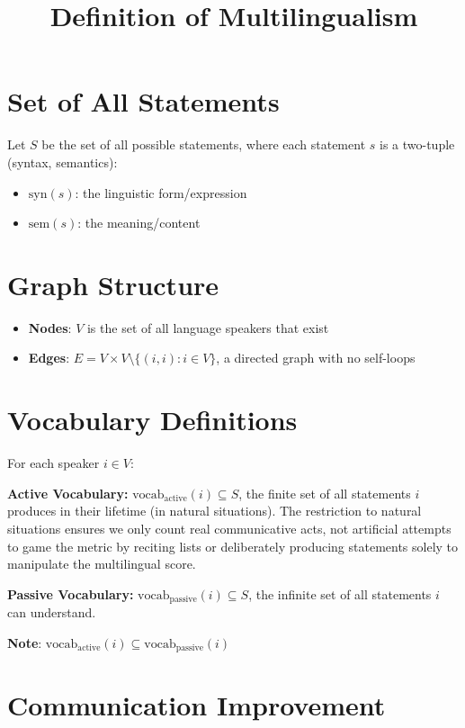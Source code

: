 \documentclass[11pt,a4paper]{article}
\title{Definition of Multilingualism}
\author{}
\begin{document}
\maketitle

\section{Set of All Statements}

Let $S$ be the set of all possible statements, where each statement $s$ is a two-tuple (syntax, semantics):
\begin{itemize}
    \item $\text{syn}(s)$: the linguistic form/expression
    \item $\text{sem}(s)$: the meaning/content
\end{itemize}

\section{Graph Structure}

\begin{itemize}
    \item \textbf{Nodes}: $V$ is the set of all language speakers that exist
    \item \textbf{Edges}: $E = V \times V \setminus \{(i,i) : i \in V\}$, a directed graph with no self-loops
\end{itemize}

\section{Vocabulary Definitions}

For each speaker $i \in V$:

\noindent\textbf{Active Vocabulary:} $\text{vocab}_\text{active}(i) \subseteq S$, the finite set of all statements $i$ produces in their lifetime (in natural situations). The restriction to natural situations ensures we only count real communicative acts, not artificial attempts to game the metric by reciting lists or deliberately producing statements solely to manipulate the multilingual score.

\noindent\textbf{Passive Vocabulary:} $\text{vocab}_\text{passive}(i) \subseteq S$, the infinite set of all statements $i$ can understand.

\noindent\textbf{Note}: $\text{vocab}_\text{active}(i) \subseteq \text{vocab}_\text{passive}(i)$

\section{Communication Improvement}
\end{document}
